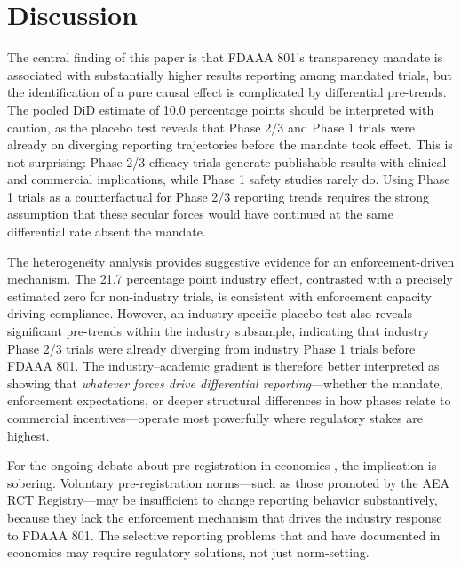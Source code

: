 \documentclass[12pt]{article}
\begin{document}


\section{Discussion}

The central finding of this paper is that FDAAA 801's transparency mandate is associated with substantially higher results reporting among mandated trials, but the identification of a pure causal effect is complicated by differential pre-trends. The pooled DiD estimate of 10.0 percentage points should be interpreted with caution, as the placebo test reveals that Phase 2/3 and Phase 1 trials were already on diverging reporting trajectories before the mandate took effect. This is not surprising: Phase 2/3 efficacy trials generate publishable results with clinical and commercial implications, while Phase 1 safety studies rarely do. Using Phase 1 trials as a counterfactual for Phase 2/3 reporting trends requires the strong assumption that these secular forces would have continued at the same differential rate absent the mandate.

The heterogeneity analysis provides suggestive evidence for an enforcement-driven mechanism. The 21.7 percentage point industry effect, contrasted with a precisely estimated zero for non-industry trials, is consistent with enforcement capacity driving compliance. However, an industry-specific placebo test also reveals significant pre-trends within the industry subsample, indicating that industry Phase 2/3 trials were already diverging from industry Phase 1 trials before FDAAA 801. The industry--academic gradient is therefore better interpreted as showing that \textit{whatever forces drive differential reporting}---whether the mandate, enforcement expectations, or deeper structural differences in how phases relate to commercial incentives---operate most powerfully where regulatory stakes are highest.

For the ongoing debate about pre-registration in economics \citep{olken2015promises, christensen2019transparency, miguel2014promoting}, the implication is sobering. Voluntary pre-registration norms---such as those promoted by the AEA RCT Registry---may be insufficient to change reporting behavior substantively, because they lack the enforcement mechanism that drives the industry response to FDAAA 801. The selective reporting problems that \citet{brodeur2020methods} and \citet{andrews2019identification} have documented in economics may require regulatory solutions, not just norm-setting.
\end{document}
